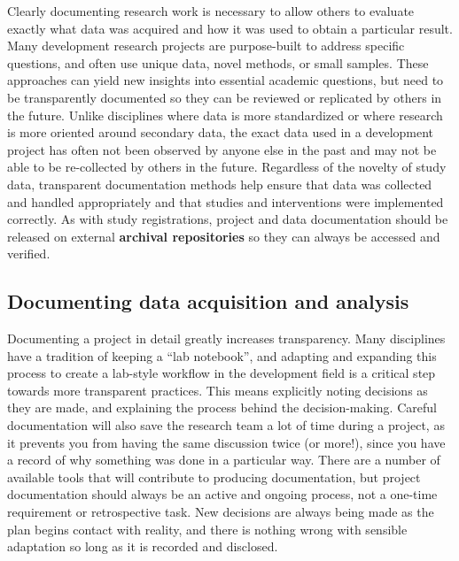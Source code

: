 Clearly documenting research work is necessary
to allow others to evaluate exactly what data was acquired and how it was used
to obtain a particular result.
Many development research projects are purpose-built
to address specific questions,
and often use unique data, novel methods, or small samples.
These approaches can yield new insights into essential academic questions,
but need to be transparently documented so they can be reviewed
or replicated by others in the future.
Unlike disciplines where data is more standardized
or where research is more oriented around secondary data,
 the exact data used in a development project
has often not been observed by anyone else in the past
and may not be able to be re-collected by others in the future.
Regardless of the novelty of study data,
transparent documentation methods help ensure
that data was collected and handled appropriately
and that studies and interventions were implemented correctly.
As with study registrations, project and data documentation
should be released on external \textbf{archival repositories}
so they can always be accessed and verified.

\subsection{Documenting data acquisition and analysis}

Documenting a project in detail greatly increases transparency.
Many disciplines have a tradition of keeping a ``lab notebook'',
and adapting and expanding this process to create a
lab-style workflow in the development field is a
critical step towards more transparent practices.
This means explicitly noting decisions as they are made,
and explaining the process behind the decision-making.
Careful documentation will also save the research team a lot of time during a project,
as it prevents you from having the same discussion twice (or more!),
since you have a record of why something was done in a particular way.
There are a number of available tools
that will contribute to producing documentation,
but project documentation should always be an active and ongoing process,
not a one-time requirement or retrospective task.
New decisions are always being made as the plan begins contact with reality,
and there is nothing wrong with sensible adaptation so long as it is recorded and disclosed.

